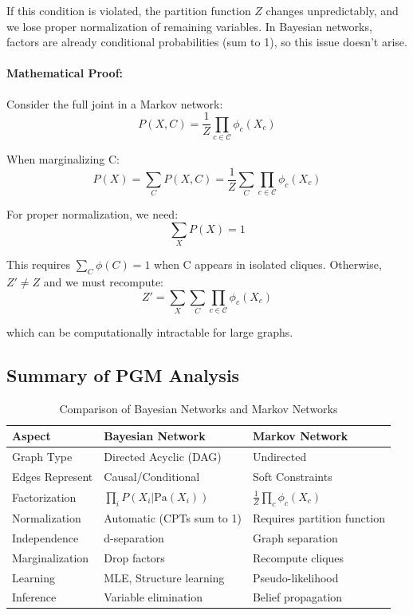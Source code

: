 \documentclass[conference]{IEEEtran}
\begin{document}
If this condition is violated, the partition function $Z$ changes unpredictably, and we lose proper normalization of remaining variables. In Bayesian networks, factors are already conditional probabilities (sum to 1), so this issue doesn't arise.

\paragraph{Mathematical Proof:}
Consider the full joint in a Markov network:
\begin{equation}
P(X, C) = \frac{1}{Z} \prod_{c \in \mathcal{C}} \phi_c(X_c)
\end{equation}

When marginalizing C:
\begin{equation}
P(X) = \sum_C P(X, C) = \frac{1}{Z} \sum_C \prod_{c \in \mathcal{C}} \phi_c(X_c)
\end{equation}

For proper normalization, we need:
\begin{equation}
\sum_X P(X) = 1
\end{equation}

This requires $\sum_C \phi(C) = 1$ when C appears in isolated cliques. Otherwise, $Z' \neq Z$ and we must recompute:
\begin{equation}
Z' = \sum_X \sum_C \prod_{c \in \mathcal{C}} \phi_c(X_c)
\end{equation}

which can be computationally intractable for large graphs.

\subsection{Summary of PGM Analysis}

\begin{table}[!t]
\renewcommand{\arraystretch}{1.3}
\caption{Comparison of Bayesian Networks and Markov Networks}
\label{tab:pgm_comparison}
\centering
\begin{tabular}{lll}
\hline
\textbf{Aspect} & \textbf{Bayesian Network} & \textbf{Markov Network} \\ \hline
Graph Type & Directed Acyclic (DAG) & Undirected \\
Edges Represent & Causal/Conditional & Soft Constraints \\
Factorization & $\prod_i P(X_i|\text{Pa}(X_i))$ & $\frac{1}{Z}\prod_c \phi_c(X_c)$ \\
Normalization & Automatic (CPTs sum to 1) & Requires partition function \\
Independence & d-separation & Graph separation \\
Marginalization & Drop factors & Recompute cliques \\
Learning & MLE, Structure learning & Pseudo-likelihood \\
Inference & Variable elimination & Belief propagation \\ \hline
\end{tabular}
\end{table}
\end{document}
